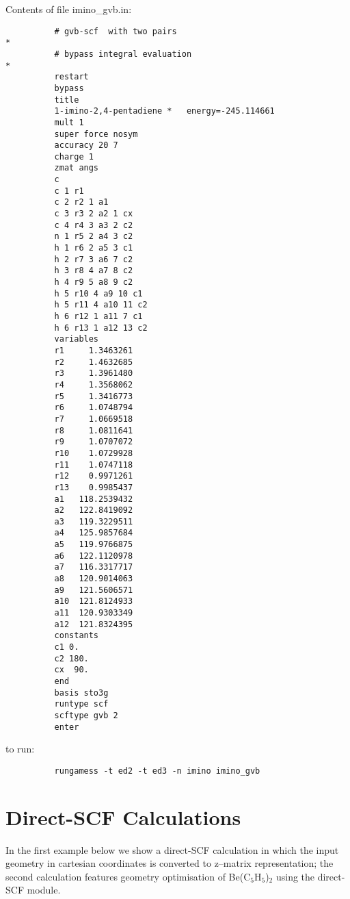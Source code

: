 \documentclass[11pt,fleqn]{article}
\begin{document}
Contents of file imino\_gvb.in:
{
\footnotesize
\begin{verbatim}
          # gvb-scf  with two pairs                                   *
          # bypass integral evaluation                                *
          restart
          bypass
          title
          1-imino-2,4-pentadiene *   energy=-245.114661
          mult 1
          super force nosym
          accuracy 20 7
          charge 1
          zmat angs
          c
          c 1 r1
          c 2 r2 1 a1
          c 3 r3 2 a2 1 cx
          c 4 r4 3 a3 2 c2
          n 1 r5 2 a4 3 c2
          h 1 r6 2 a5 3 c1
          h 2 r7 3 a6 7 c2
          h 3 r8 4 a7 8 c2
          h 4 r9 5 a8 9 c2
          h 5 r10 4 a9 10 c1
          h 5 r11 4 a10 11 c2
          h 6 r12 1 a11 7 c1 
          h 6 r13 1 a12 13 c2
          variables
          r1     1.3463261 
          r2     1.4632685
          r3     1.3961480 
          r4     1.3568062 
          r5     1.3416773 
          r6     1.0748794
          r7     1.0669518
          r8     1.0811641
          r9     1.0707072
          r10    1.0729928
          r11    1.0747118
          r12    0.9971261
          r13    0.9985437
          a1   118.2539432
          a2   122.8419092
          a3   119.3229511
          a4   125.9857684
          a5   119.9766875
          a6   122.1120978
          a7   116.3317717
          a8   120.9014063
          a9   121.5606571
          a10  121.8124933
          a11  120.9303349
          a12  121.8324395
          constants
          c1 0.
          c2 180.
          cx  90.
          end
          basis sto3g
          runtype scf
          scftype gvb 2
          enter
\end{verbatim}
}
to run:
{
\footnotesize
\begin{verbatim}
          rungamess -t ed2 -t ed3 -n imino imino_gvb
\end{verbatim}
}

\section[Direct-SCF Calculations]{Direct-SCF Calculations}

In the first example below we show a direct-SCF calculation
in which the input geometry in cartesian coordinates
is converted to z--matrix representation; the second calculation
features geometry optimisation of Be(C$_{5}$H$_{5}$)$_{2}$
using the direct-SCF module.
\end{document}
